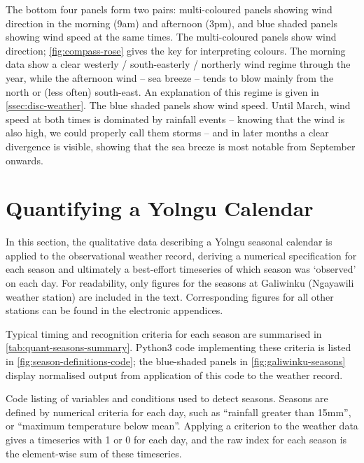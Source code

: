 \begin{framedbox}
    The bottom four panels form two pairs: multi-coloured panels showing wind
    direction in the morning (9am) and afternoon (3pm), and blue shaded
    panels showing wind speed at the same times.
    The multi-coloured panels show wind direction; \cref{fig:compass-rose} gives
    the key for interpreting colours.  The morning data show a clear westerly /
    south-easterly / northerly wind regime through the year, while the afternoon
    wind -- sea breeze -- tends to blow mainly from the north or (less often)
    south-east.  An explanation of this regime is given in \cref{ssec:disc-weather}.
    The blue shaded panels show wind speed.  Until March, wind speed at
    both times is dominated by rainfall events -- knowing that the wind is also
    high, we could properly call them storms -- and in later months a clear
    divergence is visible, showing that the sea breeze is most notable from
    September onwards.
\end{framedbox}

\checkoddpage\ifoddpage\else\ObservationMultipanels\fi


\section{Quantifying a Yolngu Calendar}
\label{sec:applying-seasons-method}

In this section, the qualitative data describing a Yolngu seasonal
calendar is applied to the observational weather record, deriving
a numerical specification for each season and ultimately a best-effort
timeseries of which season was `observed' on each day.
%
For readability, only figures for the seasons at Galiwinku
(Ngayawili weather station) are included in the text.  Corresponding
figures for all other stations can be found in the electronic appendices.

Typical timing and recognition criteria for each season are summarised in
\cref{tab:quant-seasons-summary}.  Python3 code implementing these criteria
is listed in \cref{fig:season-definitions-code}; the blue-shaded panels in
\cref{fig:galiwinku-seasons} display normalised output from application of
this code to the weather record.

\begin{framedbox}
    \centering
    \caption[Python code: definition of season indices]{
        Code listing of variables and conditions used to detect seasons.
        Seasons are defined by numerical criteria for each day, such as
        ``rainfall greater than 15mm'', or ``maximum temperature below mean''.
        Applying a criterion to the weather data gives a timeseries with 1 or 0
        for each day, and the raw index for each season is the element-wise
        sum of these timeseries.}
    \label{fig:season-definitions-code}
    
\end{framedbox}

